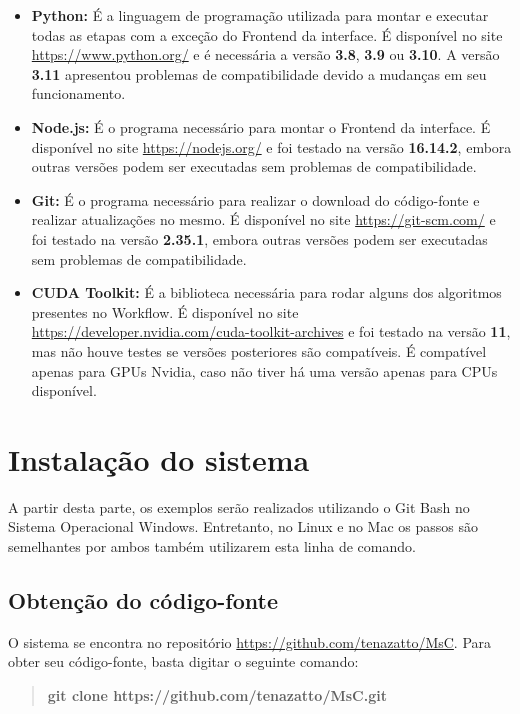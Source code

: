 \documentclass[Portugues,Final]{ic-tese-v3}
\begin{document}
\begin{itemize}
    \item {\textbf{Python:}} É a linguagem de programação utilizada para montar e executar todas as etapas com a exceção do Frontend da interface. É disponível no site \url{https://www.python.org/} e é necessária a versão \textbf{3.8}, \textbf{3.9} ou \textbf{3.10}. A versão \textbf{3.11} apresentou problemas de compatibilidade devido a mudanças em seu funcionamento.
    \item {\textbf{Node.js:}} É o programa necessário para montar o Frontend da interface. É disponível no site \url{https://nodejs.org/} e foi testado na versão \textbf{16.14.2}, embora outras versões podem ser executadas sem problemas de compatibilidade.
    \item {\textbf{Git:}} É o programa necessário para realizar o download do código-fonte e realizar atualizações no mesmo. É disponível no site \url{https://git-scm.com/} e foi testado na versão \textbf{2.35.1}, embora outras versões podem ser executadas sem problemas de compatibilidade.
	\item {\textbf{CUDA Toolkit:}} É a biblioteca necessária para rodar alguns dos algoritmos presentes no Workflow. É disponível no site \url{https://developer.nvidia.com/cuda-toolkit-archives} e foi testado na versão \textbf{11}, mas não houve testes se versões posteriores são compatíveis. É compatível apenas para GPUs Nvidia, caso não tiver há uma versão apenas para CPUs disponível.
\end{itemize}

\section{Instalação do sistema}

A partir desta parte, os exemplos serão realizados utilizando o Git Bash no Sistema Operacional Windows. Entretanto, no Linux e no Mac os passos são semelhantes por ambos também utilizarem esta linha de comando.

\subsection{Obtenção do código-fonte}

O sistema se encontra no repositório \url{https://github.com/tenazatto/MsC}. Para obter seu código-fonte, basta digitar o seguinte comando:

\begin{quote}\textbf{git clone https://github.com/tenazatto/MsC.git}\end{quote}
\end{document}
